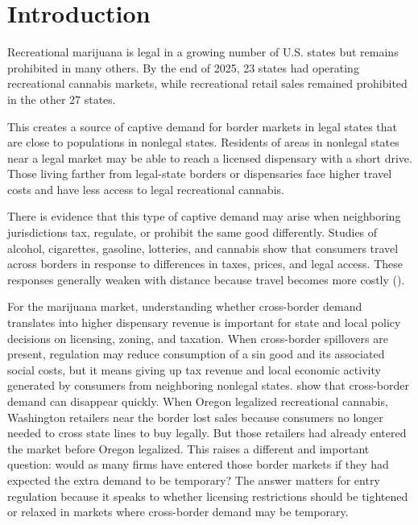 \documentclass[english,12pt]{article}
\begin{document}
\section{Introduction}

Recreational marijuana is legal in a growing number of U.S. states but remains prohibited in many others. By the end of 2025, 23 states had operating recreational cannabis markets, while recreational retail sales remained prohibited in the other 27 states.

This creates a source of captive demand for border markets in legal states that are close to populations in nonlegal states. Residents of areas in nonlegal states near a legal market may be able to reach a licensed dispensary with a short drive. Those living farther from legal-state borders or dispensaries face higher travel costs and have less access to legal recreational cannabis.

There is evidence that this type of captive demand may arise when neighboring jurisdictions tax, regulate, or prohibit the same good differently. Studies of alcohol, cigarettes, gasoline, lotteries, and cannabis show that consumers travel across borders in response to differences in taxes, prices, and legal access. These responses generally weaken with distance because travel becomes more costly (\cite{AsplundFribergWilander2007, Lovenheim2008, BeattyLarsenSommervoll2009, ChandraHeadTappata2014}).

For the marijuana market, understanding whether cross-border demand translates into higher dispensary revenue is important for state and local policy decisions on licensing, zoning, and taxation. When cross-border spillovers are present, regulation may reduce consumption of a sin good and its associated social costs, but it means giving up tax revenue and local economic activity generated by consumers from neighboring nonlegal states. \cite{HansenMillerWeber2020} show that cross-border demand can disappear quickly. When Oregon legalized recreational cannabis, Washington retailers near the border lost sales because consumers no longer needed to cross state lines to buy legally. But those retailers had already entered the market before Oregon legalized. This raises a different and important question: would as many firms have entered those border markets if they had expected the extra demand to be temporary? The answer matters for entry regulation because it speaks to whether licensing restrictions should be tightened or relaxed in markets where cross-border demand may be temporary.
\end{document}
